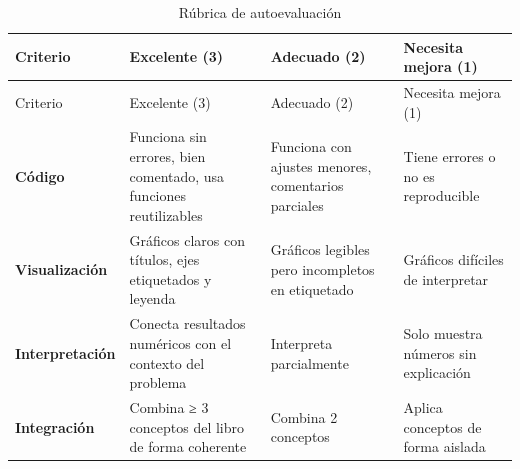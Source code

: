 \documentclass[
  letterpaper,
  DIV=11,
  numbers=noendperiod]{scrreprt}
\begin{document}
\begin{longtable}[]{@{}
  >{\raggedright\arraybackslash}p{}
  >{\raggedright\arraybackslash}p{}
  >{\raggedright\arraybackslash}p{}
  >{\raggedright\arraybackslash}p{}@{}}
\caption{Rúbrica de autoevaluación}\tabularnewline
\toprule\noalign{}
\begin{minipage}[b]{\linewidth}\raggedright
Criterio
\end{minipage} & \begin{minipage}[b]{\linewidth}\raggedright
Excelente (3)
\end{minipage} & \begin{minipage}[b]{\linewidth}\raggedright
Adecuado (2)
\end{minipage} & \begin{minipage}[b]{\linewidth}\raggedright
Necesita mejora (1)
\end{minipage} \\
\midrule\noalign{}
\endfirsthead
\toprule\noalign{}
\begin{minipage}[b]{\linewidth}\raggedright
Criterio
\end{minipage} & \begin{minipage}[b]{\linewidth}\raggedright
Excelente (3)
\end{minipage} & \begin{minipage}[b]{\linewidth}\raggedright
Adecuado (2)
\end{minipage} & \begin{minipage}[b]{\linewidth}\raggedright
Necesita mejora (1)
\end{minipage} \\
\midrule\noalign{}
\endhead
\bottomrule\noalign{}
\endlastfoot
\textbf{Código} & Funciona sin errores, bien comentado, usa funciones
reutilizables & Funciona con ajustes menores, comentarios parciales &
Tiene errores o no es reproducible \\
\textbf{Visualización} & Gráficos claros con títulos, ejes etiquetados y
leyenda & Gráficos legibles pero incompletos en etiquetado & Gráficos
difíciles de interpretar \\
\textbf{Interpretación} & Conecta resultados numéricos con el contexto
del problema & Interpreta parcialmente & Solo muestra números sin
explicación \\
\textbf{Integración} & Combina ≥ 3 conceptos del libro de forma
coherente & Combina 2 conceptos & Aplica conceptos de forma aislada \\
\end{longtable}
\end{document}
